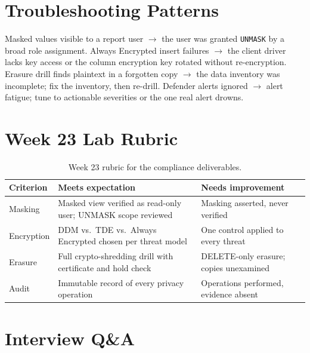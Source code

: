 \section{Troubleshooting Patterns}
Masked values visible to a report user $\rightarrow$ the user was granted \texttt{UNMASK} by a broad role assignment. Always Encrypted insert failures $\rightarrow$ the client driver lacks key access or the column encryption key rotated without re-encryption. Erasure drill finds plaintext in a forgotten copy $\rightarrow$ the data inventory was incomplete; fix the inventory, then re-drill. Defender alerts ignored $\rightarrow$ alert fatigue; tune to actionable severities or the one real alert drowns.

\section{Week 23 Lab Rubric}
\begin{table}[H]
\centering
\small
\begin{tabular}{@{}p{3.2cm}p{5.0cm}p{5.0cm}@{}}
\toprule
\textbf{Criterion} & \textbf{Meets expectation} & \textbf{Needs improvement} \\
\midrule
Masking & Masked view verified as read-only user; UNMASK scope reviewed & Masking asserted, never verified \\
Encryption & DDM vs.\ TDE vs.\ Always Encrypted chosen per threat model & One control applied to every threat \\
Erasure & Full crypto-shredding drill with certificate and hold check & DELETE-only erasure; copies unexamined \\
Audit & Immutable record of every privacy operation & Operations performed, evidence absent \\
\bottomrule
\end{tabular}
\caption{Week 23 rubric for the compliance deliverables.}
\label{tab:ch23-rubric}
\end{table}

\section{Interview Q\&A}
